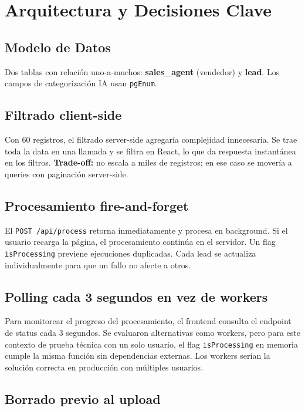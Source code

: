 \documentclass[11pt,a4paper]{article}
\begin{document}
\section{Arquitectura y Decisiones Clave}

\subsection{Modelo de Datos}

Dos tablas con relación uno-a-muchos: \textbf{sales\_agent} (vendedor) y \textbf{lead}. Los campos de categorización IA usan \texttt{pgEnum}.

\subsection{Filtrado client-side}

Con 60 registros, el filtrado server-side agregaría complejidad innecesaria. Se trae toda la data en una llamada y se filtra en React, lo que da respuesta instantánea en los filtros. \textbf{Trade-off:} no escala a miles de registros; en ese caso se movería a queries con paginación server-side.

\subsection{Procesamiento fire-and-forget}

El \texttt{POST /api/process} retorna inmediatamente y procesa en background. Si el usuario recarga la página, el procesamiento continúa en el servidor. Un flag \texttt{isProcessing} previene ejecuciones duplicadas. Cada lead se actualiza individualmente para que un fallo no afecte a otros.

\subsection{Polling cada 3 segundos en vez de workers}

Para monitorear el progreso del procesamiento, el frontend consulta el endpoint de status cada 3 segundos. Se evaluaron alternativas como workers, pero para este contexto de prueba técnica con un solo usuario, el flag \texttt{isProcessing} en memoria cumple la misma función sin dependencias externas. Los workers serían la solución correcta en producción con múltiples usuarios.

\subsection{Borrado previo al upload}
\end{document}
